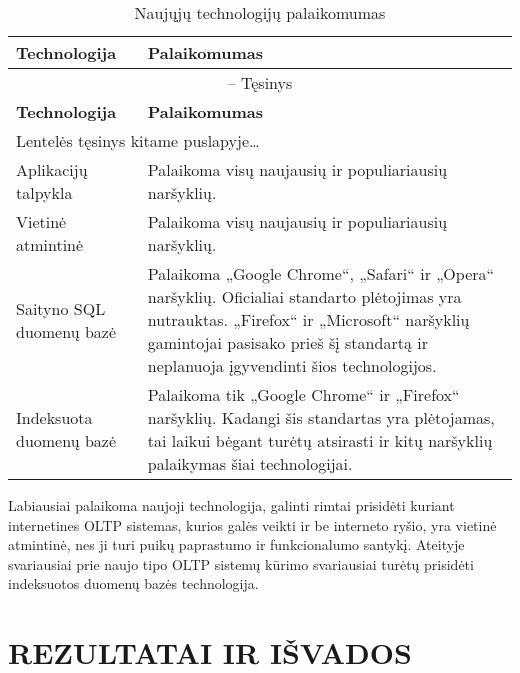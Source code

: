 \documentclass[12pt,a4paper,titlepage]{article}
\begin{document}
\begin{longtable}{|p{6.4cm}|p{6.4cm}|}
\caption{Naujųjų technologijų palaikomumas \label{table:palaikomumas}}\\

\hline \hline
{\textbf{Technologija}} &
{\textbf{Palaikomumas}}\\
\hline
\endfirsthead


\multicolumn{2}{c}{{\tablename} \thetable{} -- Tęsinys} \\[0.5ex]
\hline \hline
{\textbf{Technologija}} &
{\textbf{Palaikomumas}}\\
\hline
\endhead


\multicolumn{2}{l}{{Lentelės tęsinys kitame puslapyje\ldots}} \\
\endfoot


\hline \hline
\endlastfoot
\hline 
Aplikacijų talpykla
&
Palaikoma visų naujausių ir populiariausių naršyklių.
\\
\hline
Vietinė atmintinė
&
Palaikoma visų naujausių ir populiariausių naršyklių.
\\
\hline
Saityno SQL duomenų bazė
&
Palaikoma „Google Chrome“, „Safari“ ir „Opera“ naršyklių. Oficialiai standarto plėtojimas yra nutrauktas. „Firefox“ ir „Microsoft“ naršyklių gamintojai pasisako prieš šį standartą ir neplanuoja įgyvendinti šios technologijos.
\\
\hline
Indeksuota duomenų bazė
&
Palaikoma tik „Google Chrome“ ir „Firefox“ naršyklių. Kadangi šis standartas yra plėtojamas, tai laikui bėgant turėtų atsirasti ir kitų naršyklių palaikymas šiai technologijai.
\end{longtable}
Labiausiai palaikoma naujoji technologija, galinti rimtai prisidėti kuriant internetines OLTP sistemas, kurios galės veikti ir be interneto ryšio, yra vietinė atmintinė, nes ji turi puikų paprastumo ir funkcionalumo santykį. Ateityje svariausiai prie naujo tipo OLTP sistemų kūrimo svariausiai turėtų prisidėti indeksuotos duomenų bazės technologija.

\section*{REZULTATAI IR IŠVADOS}
\end{document}
